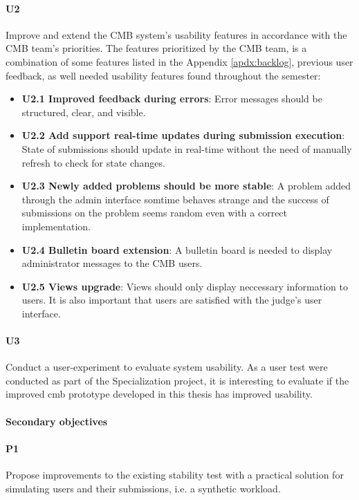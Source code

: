 \paragraph*{U2} Improve and extend the CMB system's usability features in accordance with the CMB team's priorities. The features prioritized by the CMB team, is a combination of some features listed in the Appendix \ref{apdx:backlog}, previous user feedback, as well needed usability features found throughout the semester:
  \begin{itemize}
    \item \textbf{U2.1 Improved feedback during errors}: Error messages should be structured, clear, and visible.
    \item \textbf{U2.2 Add support real-time updates during submission execution}: State of submissions should update in real-time without the need of manually refresh to check for state changes.
    \item \textbf{U2.3 Newly added problems should be more stable}: A problem added through the admin interface somtime behaves strange and the success of submissions on the problem seems random even with a correct implementation.
    \item \textbf{U2.4 Bulletin board extension}: A bulletin board is needed to display administrator messages to the CMB users.
    \item \textbf{U2.5 Views upgrade}: Views should only display neccessary information to users. It is also important that users are satisfied with the judge's user interface.
  \end{itemize}

\paragraph*{U3} Conduct a user-experiment to evaluate system usability. As a user test were conducted as part of the Specialization project, it is interesting to evaluate if the improved \gls{cmb} prototype developed in this thesis has improved usability.

\paragraph*{Secondary objectives} \hfill

\paragraph*{P1} Propose improvements to the existing stability test with a practical solution for simulating users and their submissions, i.e. a synthetic workload.

